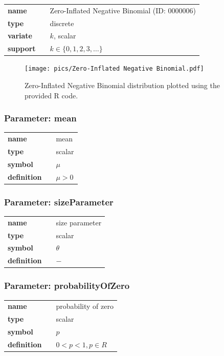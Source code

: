 \documentclass{article}
\begin{document}
  \bigskip 

\begin{tabular}{p{2cm}cl}
\textbf{name} & & Zero-Inflated Negative Binomial (ID: 0000006)\\ 
 
\textbf{type} & & discrete \\ 

\textbf{variate} & & $k$, scalar \\ 

\textbf{support} & & $k \in \{0,1,2,3,\dots\}$
\end{tabular}

\begin{figure}[ht!]
\centering
  \texttt{[image: pics/Zero-Inflated Negative Binomial.pdf]}
 \caption{Zero-Inflated Negative Binomial distribution plotted using the provided R code.}
 \label{fig:Zero-Inflated Negative Binomial}
\end{figure}

\subsubsection*{Parameter: mean}

\noindent\begin{tabular}{p{2cm}cl}
\textbf{name} & & mean \\
\textbf{type} & & scalar \\
\textbf{symbol} & & $\mu$  \\
\textbf{definition} & & $\mu > 0$
\end{tabular}
\subsubsection*{Parameter: sizeParameter}

\noindent\begin{tabular}{p{2cm}cl}
\textbf{name} & & size parameter \\
\textbf{type} & & scalar \\
\textbf{symbol} & & $\theta$  \\
\textbf{definition} & & $-$
\end{tabular}
\subsubsection*{Parameter: probabilityOfZero}

\noindent\begin{tabular}{p{2cm}cl}
\textbf{name} & & probability of zero \\
\textbf{type} & & scalar \\
\textbf{symbol} & & $p$  \\
\textbf{definition} & & $0<p<1, p \in R$
\end{tabular}
\end{document}
